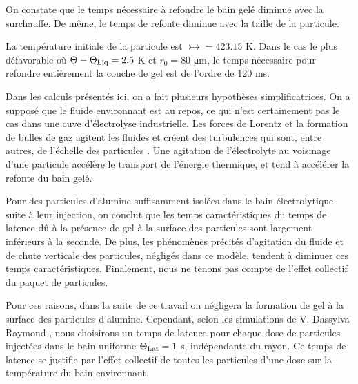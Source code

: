 On constate que le temps nécessaire à refondre le bain gelé
diminue avec la surchauffe. De même, le temps de refonte diminue avec
la taille de la particule.

La température initiale de la particule est $\tinj =
423.15$ \si{\kelvin}. Dans le cas le plus défavorable où $\Theta -
\Theta_\text{Liq} = 2.5$ \si{\kelvin} et $r_0 = 80$ \si{\micro\meter}, le
temps nécessaire pour refondre entièrement la couche de gel est de
l'ordre de 120 \si{\milli\second}.

Dans les calculs présentés ici, on a fait plusieurs hypothèses
simplificatrices. On a supposé que le fluide environnant est au
repos, ce qui n'est certainement pas le cas dans une cuve
d'électrolyse industrielle. Les forces de Lorentz et la formation de
bulles de gaz agitent les fluides et créent des turbulences qui sont,
entre autres, de l'échelle des particules \cite{Rochat2016}. Une
agitation de l'électrolyte au voisinage d'une particule accélère le
transport de l'énergie thermique, et tend à accélérer la refonte du
bain gelé.


Pour des particules d'alumine suffisamment isolées dans le bain
électrolytique suite à leur injection, on conclut que les temps
caractéristiques du temps de latence dû à la présence de gel à
la surface des particules sont largement inférieurs à la seconde. De
plus, les phénomènes précités d'agitation du fluide et de
chute verticale des particules, négligés dans ce modèle, tendent à
diminuer ces temps caractéristiques. Finalement, nous ne tenons pas
compte de l'effet collectif du paquet de particules.

Pour ces raisons, dans la suite de ce travail on négligera la
formation de gel à la surface des particules d'alumine. Cependant,
selon les simulations de V. Dassylva-Raymond \cite{Dassylva2015}, nous
choisirons un temps de latence pour chaque dose de particules
injectées dans le bain uniforme $\Theta_\text{Lat} = 1$ \si{\second}, indépendante
du rayon. Ce temps de latence se justifie par l'effet collectif de
toutes les particules d'une dose sur la température du bain
environnant.
